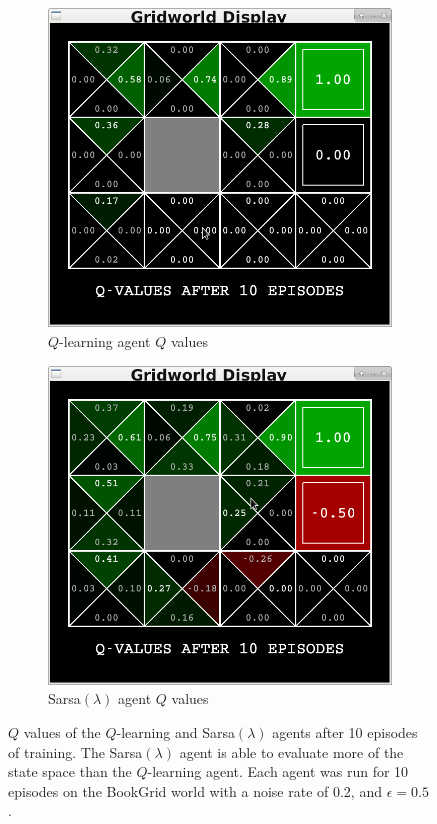 \documentclass[10pt,conference]{IEEEtran}
\begin{document}
	\begin{figure}[h]
		\centering
		\begin{subfigure}[b]{0.40\textwidth}
			\includegraphics[width=\textwidth]{./images/qlearning_gridworld_10}
			\caption{\(Q\)-learning agent \(Q\) values}
		\end{subfigure}%
		\begin{subfigure}[b]{0.40\textwidth}
			\includegraphics[width=\textwidth]{./images/sarsa_gridworld_10}
			\caption{Sarsa\((\lambda)\) agent \(Q\) values}
		\end{subfigure}
		\caption{\(Q\) values of the \(Q\)-learning and Sarsa\((\lambda)\) agents 
		after 10 episodes of training.  The Sarsa\((\lambda)\) agent is able
		to evaluate more of the state space than the \(Q\)-learning agent.
		Each agent was run for 10 episodes on the BookGrid world with a noise
		rate of 0.2, and \(\epsilon = 0.5\).}
		\label{qvalues}
	\end{figure}
\end{document}
